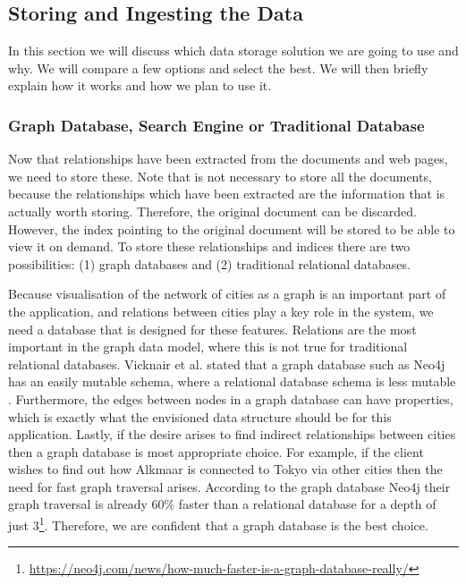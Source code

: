 \subsection{Storing and Ingesting the Data}
In this section we will discuss which data storage solution we are going to use and why. We will compare a few options and select the best. We will then briefly explain how it works and how we plan to use it.

\subsubsection{Graph Database, Search Engine or Traditional Database}
Now that relationships have been extracted from the documents and web pages, we need to store these. Note that is not necessary to store all the documents, because the relationships which have been extracted are the information that is actually worth storing. Therefore, the original document can be discarded. However, the index pointing to the original document will be stored to be able to view it on demand. To store these relationships and indices there are two possibilities: (1) graph databases and (2) traditional relational databases.

Because visualisation of the network of cities as a graph is an important part of the application, and relations between cities play a key role in the system, we need a database that is designed for these features. Relations are the most important in the graph data model, where this is not true for traditional relational databases. Vicknair et al. stated that a graph database such as Neo4j has an easily mutable schema, where a relational database schema is less mutable \cite{vicknair2010}. Furthermore, the edges between nodes in a graph database can have properties, which is exactly what the envisioned data structure should be for this application. Lastly, if the desire arises to find indirect relationships between cities then a graph database is most appropriate choice. For example, if the client wishes to find out how Alkmaar is connected to Tokyo via other cities then the need for fast graph traversal arises. According to the graph database Neo4j their graph traversal is already 60\% faster than a relational database for a depth of just 3\footnote{\url{https://neo4j.com/news/how-much-faster-is-a-graph-database-really/}}.  Therefore, we are confident that a graph database is the best choice.

